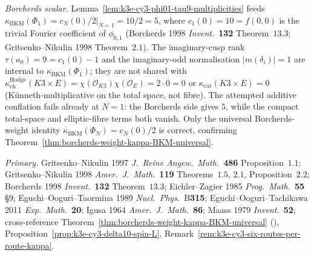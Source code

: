 \begin{remark}
\emph{Borcherds scalar.} Lemma~\ref{lem:k3e-cy3-phi01-tau9-multiplicities} feeds $\kappa_{\mathrm{BKM}}(\Phi_1) = \left.c_N(0)/2\right|_{N=1} = 10/2 = 5$, where $c_1(0) = 10 = f(0,0)$ is the trivial Fourier coefficient of $\phi_{0,1}$ (Borcherds 1998 \emph{Invent.}~\textbf{132} Theorem~$13.3$; Gritsenko--Nikulin 1998 Theorem~$2.1$). The imaginary-cusp rank $\tau(a_0) = 9 = c_1(0) - 1$ and the imaginary-odd normalisation $|m(\delta_i)| = 1$ are internal to $\kappa_{\mathrm{BKM}}(\Phi_1)$; they are not shared with $\kappa_{\mathrm{ch}}^{\mathrm{Hodge}}(K3\times E) = \chi(\mathcal O_{K3})\chi(\mathcal O_E) = 2\cdot 0 = 0$ or $\kappa_{\mathrm{cat}}(K3\times E) = 0$ (K\"unneth-multiplicative on the total space, not fibre). The attempted additive conflation fails already at $N=1$: the Borcherds side gives $5$, while the compact total-space and elliptic-fibre terms both vanish. Only the universal Borcherds-weight identity $\kappa_{\mathrm{BKM}}(\Phi_N) = c_N(0)/2$ is correct, confirming Theorem~\ref{thm:borcherds-weight-kappa-BKM-universal}.

\emph{Primary.} Gritsenko--Nikulin 1997 \emph{J.\ Reine Angew.\ Math.}~\textbf{486} Proposition~$1.1$; Gritsenko--Nikulin 1998 \emph{Amer.\ J.\ Math.}~\textbf{119} Theorems~$1.5$, $2.1$, Proposition~$2.2$; Borcherds 1998 \emph{Invent.}~\textbf{132} Theorem~$13.3$; Eichler--Zagier 1985 \emph{Prog.\ Math.}~\textbf{55} \S 9; Eguchi--Ooguri--Taormina 1989 \emph{Nucl.\ Phys.}~B\textbf{315}; Eguchi--Ooguri--Tachikawa 2011 \emph{Exp.\ Math.}~\textbf{20}; Igusa 1964 \emph{Amer.\ J.\ Math.}~\textbf{86}; Maass 1979 \emph{Invent.}~\textbf{52}; cross-reference Theorem~\ref{thm:borcherds-weight-kappa-BKM-universal} (\cite{VolI}), Proposition~\ref{prop:k3e-cy3-delta10-spin-L}, Remark~\ref{rem:k3e-cy3-six-routes-per-route-kappa}.
\end{remark}

